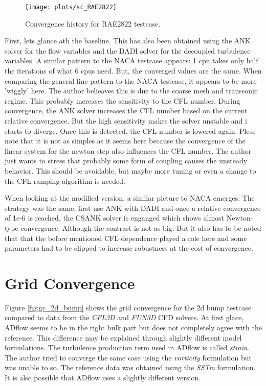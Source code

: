 \begin{figure}[H] \centering
    \texttt{[image: plots/sc\_RAE2822]}
    \caption{Convergence history for RAE2822 testcase.}
    \label{fig:sc_RAE2822}
\end{figure}

\noindent First, lets glance ath the baseline. This has also been obtained
using the ANK solver for the flow variables and the DADI solver for the
decoupled turbulence variables. A similar pattern to the NACA
testcase appears: 1 cpu takes only half the iterations of what 6 cpus need.
But, the converged values are the same. When comparing the general line pattern
to the NACA testcase, it appears to be more 'wiggly' here. The author belieaves
this is due to the coarse mesh and transsonic regime. This probably increases
the sensitivity to the CFL number. During convergence, the ANK solver increases
the CFL number based on the current relative convergence. But the high
sensitivity makes the solver unstable and i starts to diverge. Once this is
detected, the CFL number is lowered again. Plese note that it is not as simples
as it seems here because the convergence of the linear system for the newton
step also influences the CFL number. The author just wants to stress that
probably some form of coupling causes the unsteady behavior. This should be
avoidable, but maybe more tuning or even a change to the CFL-ramping algorithm
is needed.

When looking at the modified version, a similar picture to NACA emerges. The
strategy was the same, first use ANK with DADI and once a relative convergence
of 1e-6 is reached, the CSANK solver is enganged which shows almost Newton-type
convergence. Although the contrast is not as big. But it also has to be noted
that that the before mentioned CFL dependence played a role here and some
parameters had to be clipped to increase robustness at the cost of convergence.





\section{Grid Convergence}
Figure \ref{fig:gc_2d_bump} shows the grid convergence for the 2d bump testcase
compared to data from the \textit{CFL3D} and \textit{FUN3D} CFD solvers. At
first glace, ADflow seems to be in the right bulk part but does not completely
agree with the reference. This difference may be explained through slightly
different model formulations. The turbulence production term used in ADflow is
called \textit{strain}. The author tried to converge the same case using the
\textit{vorticity} formulation but was unable to so. The reference data was
obtained using the \textit{SSTm} formulation. It is also possible that ADflow
uses a slightly different version.

